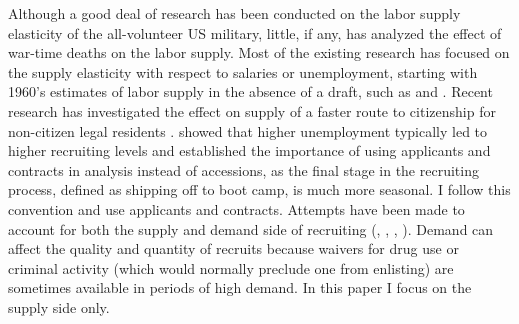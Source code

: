 \documentclass[12pt] {article}
\begin{document}
Although a good deal of research has been conducted on the labor supply
elasticity of the all-volunteer US military, little, if any, has analyzed
the effect of war-time deaths on the labor supply. Most of the existing
research has focused on the supply elasticity with respect to salaries or unemployment, starting with 1960's estimates of labor supply in the absence of a draft, such as
\cite{Altman-Fechter-AER-1967} and \cite{Altman-JHR-1969}. Recent research has investigated the effect on supply of a faster route to citizenship for non-citizen legal residents \citep{cunha2014expedited}. \cite{Dale-Gilroy-AER-Note-1985} showed that higher unemployment typically led to higher recruiting levels and established the importance of using applicants and contracts in analysis instead of accessions, as the final stage in the recruiting process, defined as shipping off
to boot camp, is much more seasonal. I follow this convention and use applicants and contracts. %
Attempts have been made to account for both the supply and demand side of recruiting (\cite{Dertouzos-RAND-1985}, \cite{Hanssens-Levien-Advertising}, \cite{Dertouzous-Polich-Army-Ads}, \cite{Asch-Incentives}). Demand can affect the quality and quantity of recruits because waivers for drug use or criminal activity (which would normally preclude one from enlisting) are sometimes available in periods of high demand. In this paper I focus on the supply side only.

\end{document}
